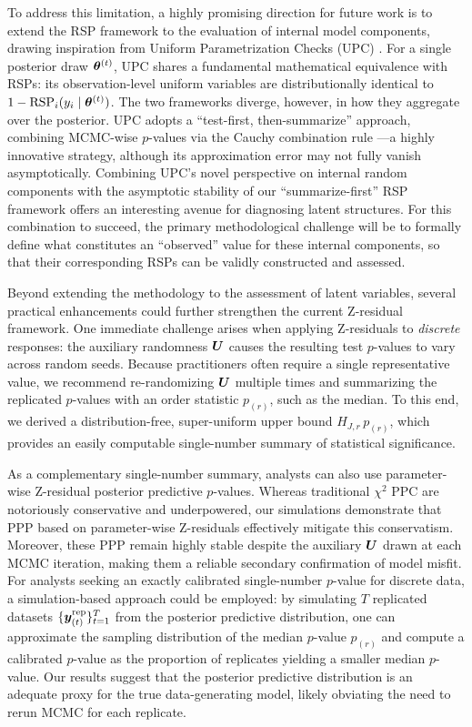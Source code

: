 To address this limitation, a highly promising direction for future work is to extend the RSP framework to the evaluation of internal model components, drawing inspiration from Uniform Parametrization Checks (UPC) \citep{covington2025bayesian}. For a single posterior draw $\bm{\theta}^{(t)}$, UPC shares a fundamental mathematical equivalence with RSPs: its observation-level uniform variables are distributionally identical to $1 - \text{RSP}_i(y_i \mid \bm{\theta}^{(t)})$. The two frameworks diverge, however, in how they aggregate over the posterior. UPC adopts a ``test-first, then-summarize'' approach, combining MCMC-wise $p$-values via the Cauchy combination rule \citep{liu2020cauchy}---a highly innovative strategy, although its approximation error may not fully vanish asymptotically. Combining UPC's novel perspective on internal random components with the asymptotic stability of our ``summarize-first'' RSP framework offers an interesting avenue for diagnosing latent structures. For this combination to succeed, the primary methodological challenge will be to formally define what constitutes an ``observed'' value for these internal components, so that their corresponding RSPs can be validly constructed and assessed.

Beyond extending the methodology to the assessment of latent variables, several practical enhancements could further strengthen the current Z-residual framework. One immediate challenge arises when applying Z-residuals to \emph{discrete} responses: the auxiliary randomness $\bm{U}$ causes the resulting test $p$-values to vary across random seeds. Because practitioners often require a single representative value, we recommend re-randomizing $\bm{U}$ multiple times and summarizing the replicated $p$-values with an order statistic $p_{(r)}$, such as the median. To this end, we derived a distribution-free, super-uniform upper bound $H_{J,r}\, p_{(r)}$, which provides an easily computable single-number summary of statistical significance.

As a complementary single-number summary, analysts can also use parameter-wise Z-residual posterior predictive $p$-values. Whereas traditional $\chi^2$ PPC are notoriously conservative and underpowered, our simulations demonstrate that PPP based on parameter-wise Z-residuals effectively mitigate this conservatism. Moreover, these PPP remain highly stable despite the auxiliary $\bm{U}$ drawn at each MCMC iteration, making them a reliable secondary confirmation of model misfit. For analysts seeking an exactly calibrated single-number $p$-value for discrete data, a simulation-based approach could be employed: by simulating $T$ replicated datasets $\{\bm{y}^{\mathrm{rep}}_{(t)}\}_{t=1}^T$ from the posterior predictive distribution, one can approximate the sampling distribution of the median $p$-value $p_{(r)}$ and compute a calibrated $p$-value as the proportion of replicates yielding a smaller median $p$-value. Our results suggest that the posterior predictive distribution is an adequate proxy for the true data-generating model, likely obviating the need to rerun MCMC for each replicate.


